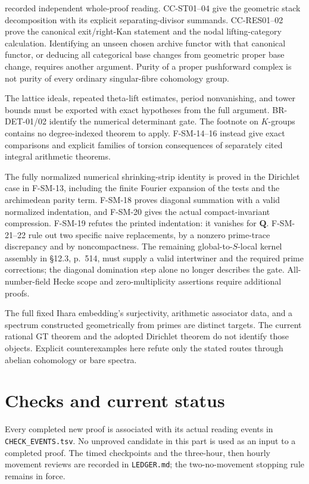 \begin{description}[style=nextline,leftmargin=0pt]
recorded independent whole-proof reading. CC-ST01--04 give the geometric
stack decomposition with its explicit separating-divisor summands.
CC-RES01--02 prove the canonical exit/right-Kan statement and the nodal
lifting-category calculation. Identifying an unseen chosen archive
functor with that canonical functor, or deducing all categorical base
changes from geometric proper base change, requires another argument.
Purity of a proper pushforward
complex is not purity of every ordinary singular-fibre cohomology group.
\item[The analytic method as a transferable theorem.]
The lattice ideals, repeated theta-lift estimates, period nonvanishing,
and tower bounds must be exported with exact hypotheses from the
full argument. BR-DET-01/02 identify the numerical determinant gate.
The footnote on $K$-groups contains no degree-indexed theorem to apply.
F-SM-14--16 instead give exact comparisons and explicit families of
torsion consequences of separately cited integral arithmetic theorems.
\item[Masullo's operator realization.]
The fully normalized numerical shrinking-strip identity is proved in
the Dirichlet case in F-SM-13, including the finite Fourier expansion
of the tests and the archimedean parity term. F-SM-18 proves diagonal summation with a valid normalized indentation,
and F-SM-20 gives the actual compact-invariant compression. F-SM-19
refutes the printed indentation: it vanishes for $\mathbf Q$.
F-SM-21--22 rule out two specific naive replacements, by a nonzero
prime-trace discrepancy and by noncompactness. The remaining
global-to-$S$-local kernel assembly in \S12.3, p.~514, must supply
a valid intertwiner and the required prime corrections; the
diagonal domination step alone no longer describes the gate. All-number-field Hecke scope and
zero-multiplicity assertions require additional proofs.
\item[Profinite GT, anabelian reconstruction and geometric spectra.]
The full fixed Ihara embedding's surjectivity, arithmetic associator
data, and a spectrum constructed geometrically from primes are distinct
targets. The current rational GT theorem and the adopted Dirichlet
theorem do not identify those objects. Explicit counterexamples here
refute only the stated routes through abelian cohomology or bare spectra.
\end{description}

\section{Checks and current status}
Every completed new proof is associated with its actual reading events
in \texttt{CHECK\_EVENTS.tsv}. No unproved candidate in this part is
used as an input to a completed proof. The timed checkpoints and the
three-hour, then hourly movement reviews are recorded in
\texttt{LEDGER.md}; the two-no-movement stopping rule remains in force.
